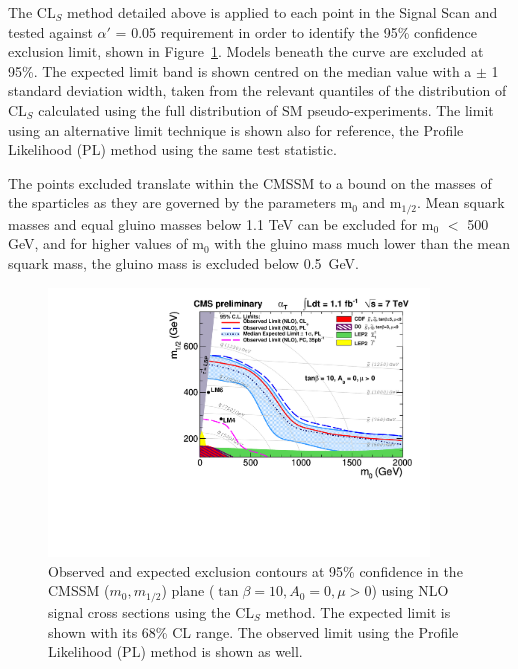 The CL$_{S}$ method detailed above is applied to each point in the Signal Scan and tested against $\alpha'$ = 0.05 requirement in order to identify the 95\% confidence exclusion limit, shown in Figure~\ref{fig:cmssm}. Models beneath the  curve are excluded at 95\%. The expected limit band is shown centred on the median value with a $\pm$ 1 standard deviation width, taken from the relevant quantiles of the distribution of CL$_{S}$ calculated using the full distribution of SM pseudo-experiments. The limit using an alternative limit technique is shown also for reference, the Profile Likelihood (PL) method using the same test statistic.

The points excluded translate within the CMSSM to a bound on the masses of the sparticles as they are governed by the parameters m$_{0}$ and m$_{1/2}$. Mean squark masses and equal gluino masses below 1.1 TeV can be excluded for m$_{0}$ $<$ 500 GeV, and for higher values of m$_{0}$ with the gluino mass much lower than the mean squark mass, the gluino mass is excluded below 0.5~GeV.

\begin{figure}[htbp]
  \begin{center}
    \includegraphics[width = 0.90\textwidth]{Figures/Analysis/PAS/RA1_ExclusionLimit_tanb10_def.pdf}
    \caption{\label{fig:cmssm} Observed and expected exclusion
      contours at 95\% confidence in the CMSSM ($m_0, m_{1/2}$) plane ($\tan \beta = 10,
A_0 = 0, \mu > 0$) using NLO signal cross sections using the
       CL$_{S}$ method. The expected limit is shown with
      its 68\% CL range. The observed limit using the Profile Likelihood (PL) method is
      shown as well. }
  \end{center}
\end{figure}


